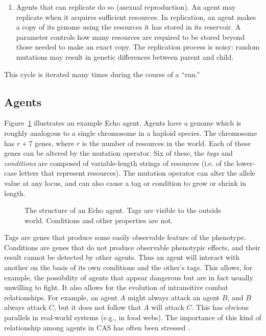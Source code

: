 \begin{enumerate}
\item
Agents that can replicate do so (asexual reproduction).  An agent may
replicate when it acquires sufficient resources.  In replication, an
agent makes a copy of its genome using the resources it has stored in
its reservoir.  A parameter controls how many resources are required
to be stored beyond those needed to make an exact copy. The
replication process is noisy: random mutations may 
result in genetic differences between parent and child.

\end{enumerate}
This cycle is iterated many times during the course of a ``run.''


\subsection{Agents}
\label{agents}

Figure~\ref{fig:example-agent} illustrates an example Echo agent.
Agents have a genome which is roughly analogous to a
single chromosome in a haploid species. The chromosome has $r + 7$
genes, where $r$ is the number of resources in the world.  Each of
these genes can be altered by the mutation operator. Six of
these, the {\em tags\/} and {\em conditions\/} are composed of
variable-length strings of resources (i.e. of the lower-case letters
that represent resources). The mutation operator can alter the allele
value at any locus, and can also cause a tag or condition to grow or
shrink in length.

\begin{figure}[htb]
\begin{center}
\leavevmode
\epsfysize=3.5in
\caption{The structure of an Echo agent. Tags are visible to the
outside world. Conditions and other properties are not.
\label{fig:example-agent}}
\end{center}
\end{figure}

Tags are genes that produce some easily observable feature of the
phenotype. Conditions are genes that do not produce observable
phenotypic effects, and their result cannot be detected by other
agents. Thus an agent will interact with another on the basis of its
own conditions and the other's tags. This allows, for example, the
possibility of agents that appear dangerous but are in fact usually
unwilling to fight. It also allows for the evolution of intransitive
combat relationships. For example, an agent $A$ might always attack an
agent $B$, and $B$ always attack $C$, but it does not follow that $A$
will attack $C$. This has obvious parallels in real-world systems
(e.g., in food webs). The importance of this kind of relationship
among agents in CAS has often been stressed
\cite{Holland92,Holland93b}.

